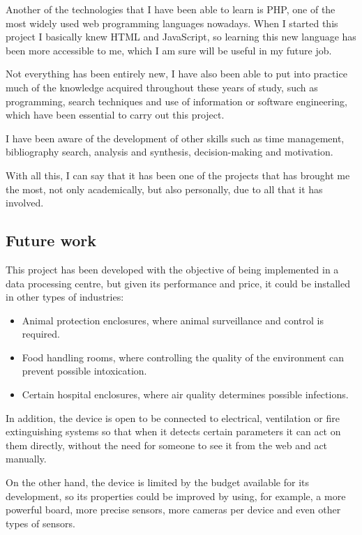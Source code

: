 Another of the technologies that I have been able to learn is PHP, one of the most widely used web programming languages nowadays. When I started this project I basically knew HTML and JavaScript, so learning this new language has been more accessible to me, which I am sure will be useful in my future job.

Not everything has been entirely new, I have also been able to put into practice much of the knowledge acquired throughout these years of study, such as programming, search techniques and use of information or software engineering, which have been essential to carry out this project.

I have been aware of the development of other skills such as time management, bibliography search, analysis and synthesis, decision-making and motivation.

With all this, I can say that it has been one of the projects that has brought me the most, not only academically, but also personally, due to all that it has involved.

\subsection{Future work}\label{subsec:future-work}
This project has been developed with the objective of being implemented in a data processing centre, but given its performance and price, it could be installed in other types of industries:
\begin{itemize}
	\item Animal protection enclosures, where animal surveillance and control is required.
	\item Food handling rooms, where controlling the quality of the environment can prevent possible intoxication.
	\item Certain hospital enclosures, where air quality determines possible infections.
\end{itemize}

In addition, the device is open to be connected to electrical, ventilation or fire extinguishing systems so that when it detects certain parameters it can act on them directly, without the need for someone to see it from the web and act manually.

On the other hand, the device is limited by the budget available for its development, so its properties could be improved by using, for example, a more powerful board, more precise sensors, more cameras per device and even other types of sensors.